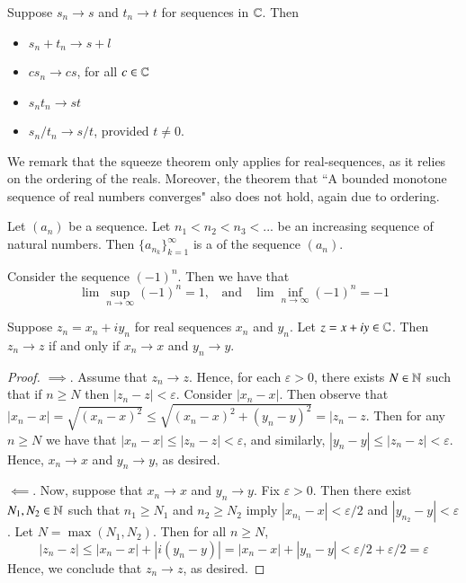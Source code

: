 \begin{theorem}
    Suppose $s_n\rightarrow s$ and $t_n\rightarrow t$ for sequences in $\mathbb C$. Then \begin{itemize}
        \item $s_n+t_n\rightarrow s+l$
        \item $cs_n \rightarrow cs$, for all $c \in \mathbb C$
        \item $s_nt_n \rightarrow st$
        \item $s_n/t_n\rightarrow s/t$, provided $t \neq 0$.
    \end{itemize}
\end{theorem}

We remark that the squeeze theorem only applies for real-sequences, as it relies on the ordering of the reals. Moreover, the theorem that ``A bounded monotone sequence of real numbers converges" also does not hold, again due to ordering.

\begin{definition}
    Let $(a_n)$ be a sequence. Let $n_1 < n_2 < n_3 < ...$ be an increasing sequence of natural numbers. Then $\{a_{n_k}\}_{k=1}^{\infty}$ is a  of the sequence $(a_n)$.
\end{definition}

\begin{example}
    Consider the sequence $(-1)^n$. Then we have that \begin{equation*}
        \lim\sup\limits_{n\rightarrow\infty}(-1)^n = 1,\;\;\text{ and }\;\;\lim\inf\limits_{n\rightarrow\infty}(-1)^n = -1
    \end{equation*}
\end{example}


\begin{theorem}
    Suppose $z_n = x_n+iy_n$ for real sequences $x_n$ and $y_n$. Let $z = x+iy \in \mathbb C$. Then $z_n\rightarrow z$ if and only if $x_n\rightarrow x$ and $y_n\rightarrow y$.
\end{theorem}
\begin{proof}
    $\implies$. Assume that $z_n\rightarrow z$. Hence, for each $\varepsilon > 0$, there exists $N \in \mathbb N$ such that if $n \geq N$ then $|z_n - z| < \varepsilon$. Consider $|x_n - x|$. Then observe that $|x_n-x| = \sqrt{(x_n-x)^2}\leq \sqrt{(x_n-x)^2+(y_n-y)^2} = |z_n - z$. Then for any $n \geq N$ we have that $|x_n - x| \leq |z_n - z| < \varepsilon$, and similarly, $|y_n - y| \leq |z_n - z| < \varepsilon$. Hence, $x_n\rightarrow x$ and $y_n\rightarrow y$, as desired.

    $\impliedby$. Now, suppose that $x_n\rightarrow x$ and $y_n\rightarrow y$. Fix $\varepsilon > 0$. Then there exist $N_1,N_2 \in \mathbb N$ such that $n_1 \geq N_1$ and $n_2 \geq N_2$ imply $|x_{n_1} - x| < \varepsilon/2$ and $|y_{n_2}-y| < \varepsilon$. Let $N = \max(N_1,N_2)$. Then for all $n \geq N$, \begin{equation*}
        |z_n - z| \leq |x_n - x| + |i(y_n - y)| = |x_n - x| + |y_n - y| < \varepsilon/2+\varepsilon/2 = \varepsilon
    \end{equation*}
    Hence, we conclude that $z_n\rightarrow z$, as desired.
\end{proof}

